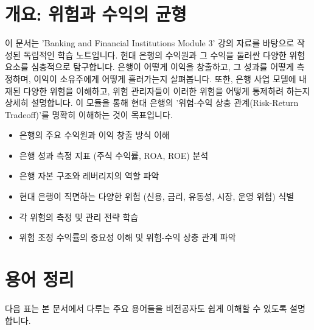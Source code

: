 \documentclass[11pt,a4paper]{book}
\theoremstyle{definition}
\begin{document}
\section{개요: 위험과 수익의 균형}

이 문서는 'Banking and Financial Institutions Module 3' 강의 자료를 바탕으로 작성된 독립적인 학습 노트입니다.
현대 은행의 수익원과 그 수익을 둘러싼 다양한 위험 요소를 심층적으로 탐구합니다.
은행이 어떻게 이익을 창출하고, 그 성과를 어떻게 측정하며, 이익이 소유주에게 어떻게 흘러가는지 살펴봅니다.
또한, 은행 사업 모델에 내재된 다양한 위험을 이해하고, 위험 관리자들이 이러한 위험을 어떻게 통제하려 하는지 상세히 설명합니다.
이 모듈을 통해 현대 은행의 '위험-수익 상충 관계(Risk-Return Tradeoff)'를 명확히 이해하는 것이 목표입니다.

\begin{summarybox}[title=\textbf{학습 목표 요약}]
\begin{itemize}
    \item 은행의 주요 수익원과 이익 창출 방식 이해
    \item 은행 성과 측정 지표 (주식 수익률, ROA, ROE) 분석
    \item 은행 자본 구조와 레버리지의 역할 파악
    \item 현대 은행이 직면하는 다양한 위험 (신용, 금리, 유동성, 시장, 운영 위험) 식별
    \item 각 위험의 측정 및 관리 전략 학습
    \item 위험 조정 수익률의 중요성 이해 및 위험-수익 상충 관계 파악
\end{itemize}
\end{summarybox}


\section{용어 정리}

다음 표는 본 문서에서 다루는 주요 용어들을 비전공자도 쉽게 이해할 수 있도록 설명합니다.
\end{document}

